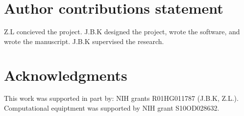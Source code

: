 \documentclass[unnumsec,webpdf,modern,large]{mam-authoring-template}%
\theoremstyle{thmstyleone}%
\theoremstyle{thmstyletwo}%
\theoremstyle{thmstylethree}%
\begin{document}
\section{Author contributions statement}
Z.L concieved the project. J.B.K designed the project, wrote the software, and wrote the manuscript. J.B.K supervised the research. 

\section{Acknowledgments}
This work was supported in part by: NIH grants R01HG011787 (J.B.K, Z.L.). Computational equiptment was supported by NIH grant S10OD028632.


\end{document}
